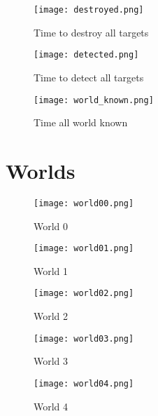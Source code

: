 \begin{figure}[H]
	\centering
	\texttt{[image: destroyed.png]}
	\caption{Time to destroy all targets}
	\label{fig:time_to_destroy}
\end{figure}

\begin{figure}[H]
	\centering
	\texttt{[image: detected.png]}
	\caption{Time to detect all targets}
	\label{fig:time_to_detect}
\end{figure}

\begin{figure}[H]
	\centering
	\texttt{[image: world\_known.png]}
	\caption{Time all world known}
	\label{fig:time_all_world_known}
\end{figure}


\chapter{Worlds}
\label{sec:world_images}
\begin{figure}[H]
	\centering
	\texttt{[image: world00.png]}
	\caption{World 0}
	\label{fig:world0}
\end{figure}

\begin{figure}[H]
	\centering
	\texttt{[image: world01.png]}
	\caption{World 1}
	\label{fig:world1}
\end{figure}

\begin{figure}[H]
	\centering
	\texttt{[image: world02.png]}
	\caption{World 2}
	\label{fig:world2}
\end{figure}

\begin{figure}[H]
	\centering
	\texttt{[image: world03.png]}
	\caption{World 3}
	\label{fig:world3}
\end{figure}

\begin{figure}[H]
	\centering
	\texttt{[image: world04.png]}
	\caption{World 4}
	\label{fig:world4}
\end{figure}

